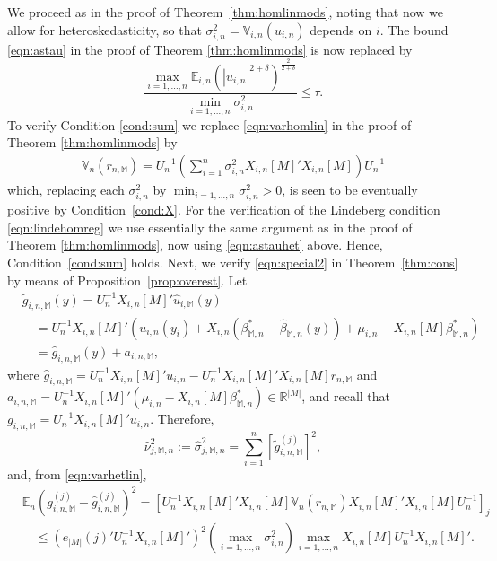 \documentclass[preprint]{imsart}
\newcommand{\R}{{\mathbb R}}
\newcommand{\E}{{\mathbb E}}
\newcommand{\V}{{\mathbb V}}
\newcommand{\M}{\mathbb M}
\numberwithin{equation}{section}
\begin{document}
We proceed as in the proof of Theorem~\ref{thm:homlinmods}, noting that now we allow for heteroskedasticity, so that $\sigma_{i,n}^2 = \mathbb{V}_{i,n}(u_{i,n})$ depends on $i$. The bound \eqref{eqn:astau} in the proof of Theorem \ref{thm:homlinmods} is now replaced by
%
\begin{equation}\label{eqn:astauhet}
\frac{\max_{i = 1, \hdots, n} \mathbb{E}_{i,n} (|u_{i,n}|^{2+\delta})^{\frac{2}{2+\delta}}}{\min_{i = 1, \hdots, n} \sigma_{i,n}^2} \leq \tau.
\end{equation}
%
To verify Condition \ref{cond:sum} we replace \eqref{eqn:varhomlin} in the proof of Theorem \ref{thm:homlinmods} by
%
\begin{align}\label{eqn:varhetlin}
\mathbb{V}_{n} \left( r_{n,\M} \right) =  
U_n^{-1} \left(\sum_{i = 1}^n \sigma_{i,n}^2 X_{i,n}[M]'X_{i,n}[M] \right)U_n^{-1}
\end{align}
%
which, replacing each $\sigma_{i,n}^2$ by $\min_{i = 1, \hdots, n} \sigma_{i,n}^2 > 0$, is seen to be eventually positive by Condition~\ref{cond:X}. For the verification of the Lindeberg condition \eqref{eqn:lindehomreg} we use essentially the same argument as in the proof of Theorem \ref{thm:homlinmods}, now using \eqref{eqn:astauhet} above. Hence, Condition~\ref{cond:sum} holds.
Next, we verify \eqref{eqn:special2} in Theorem~\ref{thm:cons} by means of Proposition~\ref{prop:overest}. Let
\begin{align*}
&\tilde{g}_{i,n,\M}(y) = U_n^{-1}X_{i,n}[M]'\hat{u}_{i,\M}(y) \\
&\quad=
U_n^{-1}X_{i,n}[M]'\left( u_{i,n}(y_i)  + X_{i,n}(\beta_{\M,n}^* - \hat{\beta}_{\M,n}(y)) + \mu_{i,n}-X_{i,n}[M]\beta_{\M,n}^*\right)\\
&\quad= \hat{g}_{i,n,\M}(y) + a_{i,n,\M},
\end{align*}
where $\hat{g}_{i,n,\M} = U_n^{-1}X_{i,n}[M]'u_{i,n} - U_n^{-1}X_{i,n}[M]'X_{i,n}[M]r_{n,\M}$ and $a_{i,n,\M}= U_n^{-1}X_{i,n}[M]'(\mu_{i,n}-X_{i,n}[M]\beta_{\M,n}^*)\in\R^{|M|}$, and recall that $g_{i,n,\M} = U_n^{-1}X_{i,n}[M]'u_{i,n}$.
Therefore, 
$$
\hat{\nu}_{j,\M,n}^2 := \hat{\sigma}_{j,\M,n}^2 = \sum_{i=1}^n \left[\tilde{g}_{i,n,\M}^{(j)}\right]^2,
$$
and, from \eqref{eqn:varhetlin}, 
\begin{align*}
&\E_n\left(g_{i,n,\M}^{(j)} - \hat{g}_{i,n,\M}^{(j)}\right)^2
= 
\left[U_n^{-1}X_{i,n}[M]'X_{i,n}[M]\V_n(r_{n,\M})X_{i,n}[M]'X_{i,n}[M]U_n^{-1}\right]_j \\
&\quad\le
(e_{|M|}(j)'U_n^{-1}X_{i,n}[M]')^2 
\left(\max_{i=1,\dots, n}\sigma_{i,n}^2\right) 
\max_{i=1,\dots, n}X_{i,n}[M]U_n^{-1}X_{i,n}[M]'.
\end{align*}
\end{document}
